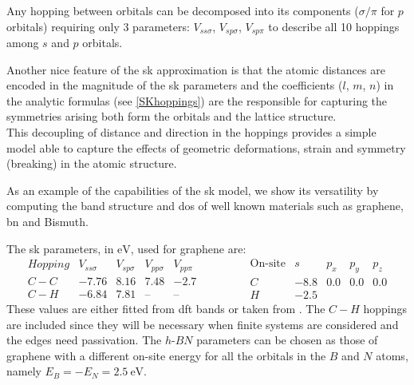 Any hopping between orbitals can be decomposed into its components ($\sigma/\pi$ for $p$ orbitals) requiring only 3 parameters: $V_{ss\sigma}$, $V_{sp\sigma}$, $V_{sp\pi}$ to describe all 10 hoppings among $s$ and $p$ orbitals.


Another nice feature of the \ac{sk} approximation is that the atomic distances are encoded in the magnitude of the \ac{sk} parameters and the coefficients ($l$, $m$, $n$) in the analytic formulas (see \ref{SKhoppings}) are the responsible for capturing the symmetries arising both form the orbitals and the lattice structure.\\


This decoupling of distance and direction in the hoppings provides a simple model able to capture the effects of geometric deformations, strain and symmetry (breaking) in the atomic structure.


As an example of the capabilities of the \ac{sk} model, we show its versatility by computing the band structure and \ac{dos} of well known materials such as graphene, \ac{bn} and Bismuth.

%
%
The \ac{sk} parameters, in $\si{\eV}$, used for graphene are:
\begin{equation}
  \begin{array}{l|cccc}
    Hopping & V_{ss\sigma} & V_{sp\sigma} & V_{pp\sigma} & V_{pp\pi} \\ \hline
    C-C & -7.76 & 8.16 & 7.48 & -2.7 \\
    C-H & -6.84 & 7.81 & \text{--} & \text{--}
  \end{array}\qquad\qquad
  \begin{array}{c|cccc}
    \text{On-site} & s & p_x & p_y & p_z \\ \hline
    C & -8.8 & 0.0 & 0.0 & 0.0 \\
    H & -2.5 &     &     &
  \end{array}
\label{G_SK_params}
\end{equation}
These values are either fitted from \ac{dft} bands or taken from \cite{}. The $C-H$ hoppings are included since they will be necessary when finite systems are considered and the edges need passivation.
The $h$-$BN$ parameters can be chosen as those of graphene with a different on-site energy for all the orbitals in the $B$ and $N$ atoms, namely $E_{B} = -E_{N} =\SI{2.5}{\eV}$.

